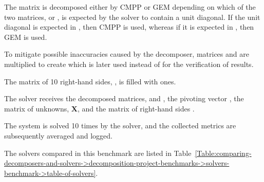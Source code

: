 \begin{tight_enumerate}
	\item The matrix is decomposed either by CMPP or GEM depending on which of the two matrices,  or , is expected by the solver to contain a unit diagonal.
If the unit diagonal is expected in , then CMPP is used, whereas if it is expected in , then GEM is used.
	\item To mitigate possible inaccuracies caused by the decomposer, matrices  and  are multiplied to create  which is later used instead of  for the verification of results.
	\item The matrix of 10 right-hand sides, , is filled with ones.
	\item The solver receives the decomposed matrices,  and , the pivoting vector , the matrix of unknowns, $\mathbf{X}$, and the matrix of right-hand sides .
	\item The system is solved 10 times by the solver, and the collected metrics are subsequently averaged and logged.
\end{tight_enumerate}

The solvers compared in this benchmark are listed in Table~\ref{Table:comparing-decomposers-and-solvers->decomposition-project-benchmarks->solvers-benchmark->table-of-solvers}.


